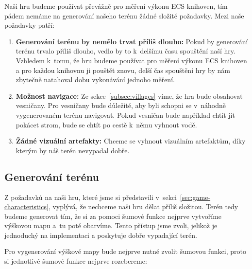 Naši hru budeme používat převážně pro měření výkonu ECS knihoven, tím pádem nemáme na generování našeho terénu žádné složité požadavky. Mezi naše požadavky patří:

\begin{enumerate}
    \item \textbf{Generování terénu by nemělo trvat příliš dlouho:} Pokud by generování terénu trvalo příliš dlouho, vedlo by to k~delšímu času spouštění naší hry. Vzhledem k~tomu, že hru budeme používat pro měření výkonu ECS knihoven a pro každou knihovnu ji pouštět znovu, delší čas spouštění hry by nám zbytečně natahoval dobu vykonávání jednoho měření.

    \item \textbf{Možnost navigace:} Ze sekce~\ref{subsec:villages} víme, že hra bude obsahovat vesničany. Pro vesničany bude důležité, aby byli schopni se v~náhodně vygenerovaném terénu navigovat. Pokud vesničan bude například chtít jít pokácet strom, bude se chtít po cestě k~němu vyhnout vodě.

    \item \textbf{Žádné vizuální artefakty:} Chceme se vyhnout vizuálním artefaktům, díky kterým by náš terén nevypadal dobře.
\end{enumerate}

\subsection{Generování terénu}
\label{sec:terrain-gen}
Z požadavků na naši hru, které jsme si představili v~sekci~\ref{sec:game-characteristics}, vyplývá, že nechceme naši hru dělat příliš složitou. Terén tedy budeme generovat tím, že si za pomoci šumové funkce nejprve vytvoříme výškovou mapu a~tu poté obarvíme. Tento přístup jsme zvoli, jelikož je jednoduchý na implementaci a poskytuje dobře vypadající terén.

Pro vygenerování výškové mapy bude nejprve nutné zvolit šumovou funkci, proto si jednotlivé šumové funkce nejprve rozebereme:

